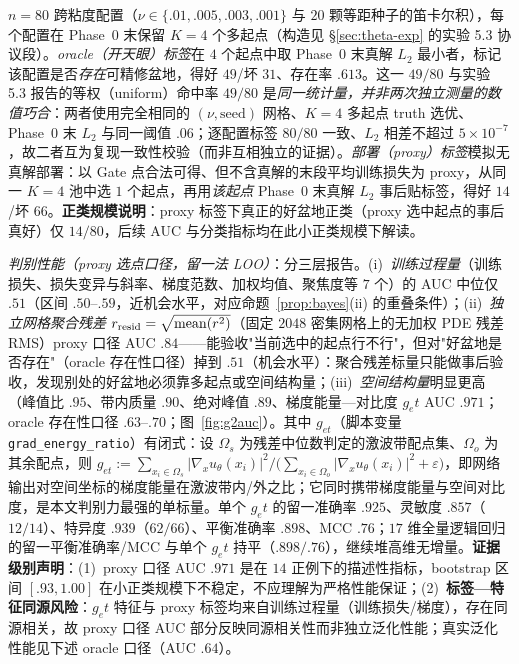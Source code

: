 \documentclass[fontset=windows,11pt]{ctexart}
\numberwithin{equation}{section}
\begin{document}
$n=80$ 跨粘度配置（$\nu\in\{.01,.005,.003,.001\}$ 与 $20$ 颗等距种子的笛卡尔积），每个配置在 Phase~0 末保留 $K=4$ 个多起点（构造见 \S\ref{sec:theta-exp} 的实验 5.3 协议段）。\emph{oracle（开天眼）标签}在 $4$ 个起点中取 Phase~0 末真解 $L_2$ 最小者，标记该配置是否\emph{存在}可精修盆地，得好 $49$/坏 $31$、存在率 $.613$。这一 $49/80$ 与实验 5.3 报告的等权（uniform）命中率 $49/80$ 是\emph{同一统计量，并非两次独立测量的数值巧合}：两者使用完全相同的 $(\nu,\text{seed})$ 网格、$K=4$ 多起点 truth 选优、Phase~0 末 $L_2$ 与同一阈值 $.06$；逐配置标签 $80/80$ 一致、$L_2$ 相差不超过 $5\times10^{-7}$，故二者互为复现一致性校验（而非互相独立的证据）。\emph{部署（proxy）标签}模拟无真解部署：以 Gate 点合法可得、但不含真解的末段平均训练损失为 proxy，从同一 $K=4$ 池中选 $1$ 个起点，再用\emph{该起点} Phase~0 末真解 $L_2$ 事后贴标签，得好 $14$/坏 $66$。\textbf{正类规模说明}：proxy 标签下真正的好盆地正类（proxy 选中起点的事后真好）仅 $14/80$，后续 AUC 与分类指标均在此小正类规模下解读。

\emph{判别性能（proxy 选点口径，留一法 LOO）}：分三层报告。(i)~\emph{训练过程量}（训练损失、损失变异与斜率、梯度范数、加权均值、聚焦度等 $7$ 个）的 AUC 中位仅 $.51$（区间 $.50$--$.59$，近机会水平，对应命题~\ref{prop:bayes}(ii) 的重叠条件）；(ii)~\emph{独立网格聚合残差} $r_{\rm resid}=\sqrt{\operatorname{mean}(r^2)}$（固定 $2048$ 密集网格上的无加权 PDE 残差 RMS）proxy 口径 AUC $.84$——能验收"当前选中的起点行不行"，但对"好盆地是否存在"（oracle 存在性口径）掉到 $.51$（机会水平）：聚合残差标量只能做事后验收，发现别处的好盆地必须靠多起点或空间结构量；(iii)~\emph{空间结构量}明显更高（峰值比 $.95$、带内质量 $.90$、绝对峰值 $.89$、梯度能量—对比度 $g_et$ AUC $.971$；oracle 存在性口径 $.63$--$.70$；图~\ref{fig:g2auc}）。其中 $g_{et}$（脚本变量 \texttt{grad\_energy\_ratio}）有闭式：设 $\Omega_s$ 为残差中位数判定的激波带配点集、$\Omega_o$ 为其余配点，则 $g_{et}:=\sum_{x_i\in\Omega_s}|\nabla_x u_\theta(x_i)|^2\big/\bigl(\sum_{x_i\in\Omega_o}|\nabla_x u_\theta(x_i)|^2+\varepsilon\bigr)$，即网络输出对空间坐标的梯度能量在激波带内/外之比；它同时携带梯度能量与空间对比度，是本文判别力最强的单标量。单个 $g_et$ 的留一准确率 $.925$、灵敏度 $.857$（$12/14$）、特异度 $.939$（$62/66$）、平衡准确率 $.898$、MCC $.76$；$17$ 维全量逻辑回归的留一平衡准确率/MCC 与单个 $g_et$ 持平（$.898/.76$），继续堆高维无增量。\textbf{证据级别声明}：(1)~proxy 口径 AUC $.971$ 是在 $14$ 正例下的描述性指标，bootstrap 区间 $[.93,1.00]$ 在小正类规模下不稳定，不应理解为严格性能保证；(2)~\textbf{标签—特征同源风险}：$g_et$ 特征与 proxy 标签均来自训练过程量（训练损失/梯度），存在同源相关，故 proxy 口径 AUC 部分反映同源相关性而非独立泛化性能；真实泛化性能见下述 oracle 口径（AUC $.64$）。
\end{document}
